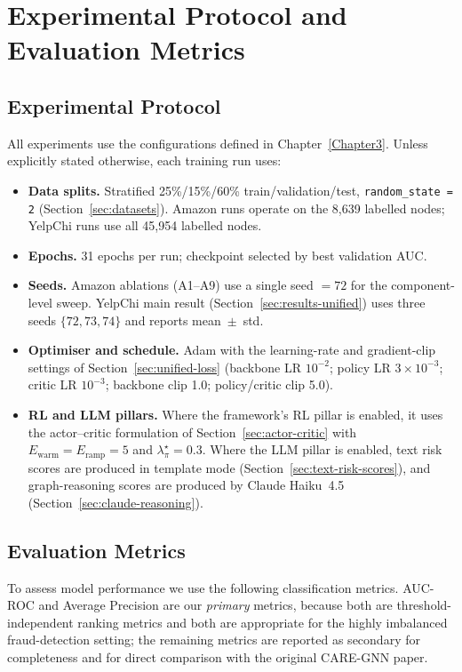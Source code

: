 \section{Experimental Protocol and Evaluation Metrics}
\label{sec:ch4-protocol}

\subsection{Experimental Protocol}
\label{sec:ch4-protocol-setup}

All experiments use the configurations defined in Chapter~\ref{Chapter3}. Unless explicitly stated otherwise, each training run uses:

\begin{itemize}
    \item \textbf{Data splits.} Stratified 25\%/15\%/60\% train/validation/test, \texttt{random\_state = 2} (Section~\ref{sec:datasets}). Amazon runs operate on the 8{,}639 labelled nodes; YelpChi runs use all 45{,}954 labelled nodes.
    \item \textbf{Epochs.} 31 epochs per run; checkpoint selected by best validation AUC.
    \item \textbf{Seeds.} Amazon ablations (A1--A9) use a single seed $=72$ for the component-level sweep. YelpChi main result (Section~\ref{sec:results-unified}) uses three seeds $\{72, 73, 74\}$ and reports mean~$\pm$~std.
    \item \textbf{Optimiser and schedule.} Adam with the learning-rate and gradient-clip settings of Section~\ref{sec:unified-loss} (backbone LR $10^{-2}$; policy LR $3\!\times\!10^{-3}$; critic LR $10^{-3}$; backbone clip 1.0; policy/critic clip 5.0).
    \item \textbf{RL and LLM pillars.} Where the framework's RL pillar is enabled, it uses the actor--critic formulation of Section~\ref{sec:actor-critic} with $E_{\text{warm}} = E_{\text{ramp}} = 5$ and $\lambda_\pi^{\star} = 0.3$. Where the LLM pillar is enabled, text risk scores are produced in template mode (Section~\ref{sec:text-risk-scores}), and graph-reasoning scores are produced by Claude Haiku~4.5 (Section~\ref{sec:claude-reasoning}).
\end{itemize}

\subsection{Evaluation Metrics}
\label{sec:ch4-metrics}

To assess model performance we use the following classification metrics. AUC-ROC and Average Precision are our \emph{primary} metrics, because both are threshold-independent ranking metrics and both are appropriate for the highly imbalanced fraud-detection setting; the remaining metrics are reported as secondary for completeness and for direct comparison with the original CARE-GNN paper.


